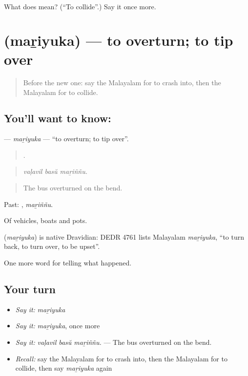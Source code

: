 \begin{tcolorbox}[breakable,colback=teal!4,colframe=teal!35!black,title={Before you move on}]
What does  mean? (\textquotedblleft{}To collide\textquotedblright{}.) Say it once more.
\end{tcolorbox}
\section[\texorpdfstring{\ml{മറിയുക} (maṟiyuka)}{മറിയുക (maṟiyuka)}]{ (maṟiyuka) — to overturn; to tip over}

\label{lesson:ML-C379-mariyuka}



\begin{quote}
Before the new one: say the Malayalam for to crash into, then the Malayalam for to collide.
\end{quote}

\subsection*{You'll want to know: }
\textbf{} — \emph{maṟiyuka} — \textquotedblleft{}to overturn; to tip over\textquotedblright{}.

\begin{quote}
  .
\end{quote}

\begin{quote}
\emph{vaḷavil basŭ maṟiññu.}
\end{quote}

\begin{quote}
The bus overturned on the bend.
\end{quote}

Past: , \emph{maṟiññu}.

Of vehicles, boats and pots.

\begin{cousinweb}
\textbf{} (\emph{maṟiyuka}) is native Dravidian: DEDR 4761 lists Malayalam \emph{maṟiyuka}, \textquotedblleft{}to turn back, to turn over, to be upset\textquotedblright{}.
\end{cousinweb}

\begin{grammarlens}[title={What you've built}]
One more word for telling what happened.
\end{grammarlens}

\subsection*{Your turn}
\begin{itemize}
\raggedright
  \item \emph{Say it:} \emph{maṟiyuka}
  \item \emph{Say it:} \emph{maṟiyuka}, once more
  \item \emph{Say it:} \emph{vaḷavil basŭ maṟiññu.} — The bus overturned on the bend.
  \item \emph{Recall:} say the Malayalam for to crash into, then the Malayalam for to collide, then say \emph{maṟiyuka} again
\end{itemize}

